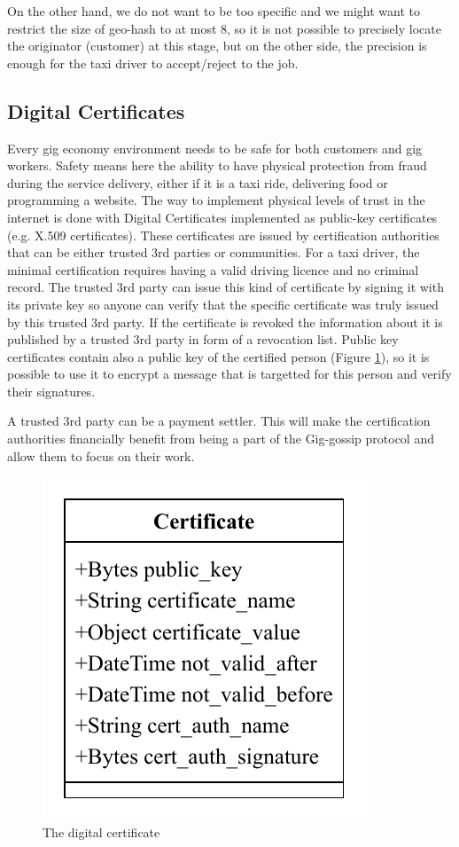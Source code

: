 \documentclass{article}
\begin{document}
On the other hand, we do not want to be too specific and we might want to restrict the size of geo-hash to at most 8, so it is not possible to precisely locate the originator (customer) at this stage, but on the other side, the precision is enough for the taxi driver to accept/reject to the job.

\subsection{Digital Certificates}

Every gig economy environment needs to be safe for both customers and gig workers. Safety means here the ability to have physical protection from fraud during the service delivery, either if it is a taxi ride, delivering food or programming a website. The way to implement physical levels of trust in the internet is done with Digital Certificates implemented as public-key certificates (e.g. X.509 certificates). These certificates are issued by certification authorities that can be either trusted 3rd parties or communities. For a taxi driver, the minimal certification requires having a valid driving licence and no criminal record. The trusted 3rd party can issue this kind of certificate by signing it with its private key so anyone can verify that the specific certificate was truly issued by this trusted 3rd party. If the certificate is revoked the information about it is published by a trusted 3rd party in form of a revocation list. Public key certificates contain also a public key of the certified person (Figure \ref{fig:fr:certificate}), so it is possible to use it to encrypt a message that is targetted for this person and verify their signatures.

A trusted 3rd party can be a payment settler. This will make the certification authorities financially benefit from being a part of the Gig-gossip protocol and allow them to focus on their work.

\begin{figure}
	\centering
	\includegraphics[scale=0.7]{Certificate.pdf}
	\caption{The digital certificate}
	\label{fig:fr:certificate}
\end{figure}
\end{document}
